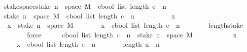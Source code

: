 \begin{isabellebody}
\ stake{\isacharunderscore}{\kern0pt}space{\isacharcolon}{\kern0pt}{\isachardoublequoteopen}stake\ n\ {\isacharbackquote}{\kern0pt}\ space\ M\ {\isacharequal}{\kern0pt}\ {\isacharbraceleft}{\kern0pt}c{\isacharcolon}{\kern0pt}{\isacharcolon}{\kern0pt}bool\ list{\isachardot}{\kern0pt}\ length\ c\ {\isacharequal}{\kern0pt}\ n{\isacharbraceright}{\kern0pt}{\isachardoublequoteclose}\isanewline
%
\isadelimproof
%
\endisadelimproof
%
\isatagproof
{}\isamarkupfalse%
\isanewline
\ \ \isamarkupfalse%
{\isachardoublequoteopen}\ stake\ n\ {\isacharbackquote}{\kern0pt}\ space\ M\ {\isasymsubseteq}\ {\isacharbraceleft}{\kern0pt}c{\isacharcolon}{\kern0pt}{\isacharcolon}{\kern0pt}bool\ list{\isachardot}{\kern0pt}\ length\ c\ {\isacharequal}{\kern0pt}\ n{\isacharbraceright}{\kern0pt}{\isachardoublequoteclose}\isanewline
\ \ \isamarkupfalse%
\ \isanewline
\ \ \ \ \isamarkupfalse%
\ x\isanewline
\ \ \ \ \isamarkupfalse%
\ {\isachardoublequoteopen}\ x\ {\isasymin}\ stake\ n\ {\isacharbackquote}{\kern0pt}\ space\ M{\isachardoublequoteclose}\isanewline
\ \ \ \ \isamarkupfalse%
\ \isamarkupfalse%
\ {\isachardoublequoteopen}x\ {\isasymin}\ {\isacharbraceleft}{\kern0pt}c{\isacharcolon}{\kern0pt}{\isacharcolon}{\kern0pt}bool\ list{\isachardot}{\kern0pt}\ length\ c\ {\isacharequal}{\kern0pt}\ n{\isacharbraceright}{\kern0pt}{\isachardoublequoteclose}\isanewline
\ \ \ \ \ \ \isamarkupfalse%
\ length{\isacharunderscore}{\kern0pt}stake\isanewline
\ \ \ \ \ \ \isamarkupfalse%
\ force\isanewline
\ \ \isamarkupfalse%
\isanewline
{}\isamarkupfalse%
\isanewline
\ \ \isamarkupfalse%
{\isachardoublequoteopen}{\isacharbraceleft}{\kern0pt}c{\isacharcolon}{\kern0pt}{\isacharcolon}{\kern0pt}bool\ list{\isachardot}{\kern0pt}\ length\ c\ {\isacharequal}{\kern0pt}\ n{\isacharbraceright}{\kern0pt}\ {\isasymsubseteq}\ stake\ n\ {\isacharbackquote}{\kern0pt}\ space\ M\ {\isachardoublequoteclose}\isanewline
\ \ \isamarkupfalse%
\ \isanewline
\ \ \ \ \isamarkupfalse%
\ x\isanewline
\ \ \ \ \isamarkupfalse%
{\isachardoublequoteopen}x\ {\isasymin}\ {\isacharbraceleft}{\kern0pt}c{\isacharcolon}{\kern0pt}{\isacharcolon}{\kern0pt}bool\ list{\isachardot}{\kern0pt}\ length\ c\ {\isacharequal}{\kern0pt}\ n{\isacharbraceright}{\kern0pt}{\isachardoublequoteclose}\isanewline
\ \ \ \ \isamarkupfalse%
\ \isamarkupfalse%
\ {\isachardoublequoteopen}length\ x\ {\isacharequal}{\kern0pt}\ n{\isachardoublequoteclose}\isanewline

\end{isabellebody}
